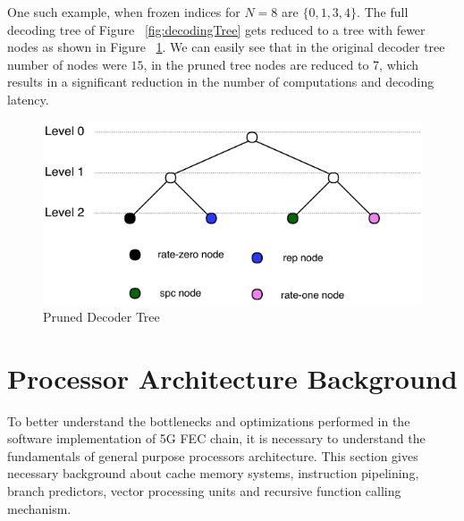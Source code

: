 One such example, when frozen indices for $N = 8$ are $\{0,1,3,4\}$. The full decoding tree of Figure ~\ref{fig:decodingTree} gets reduced to a tree with fewer nodes as shown in Figure ~\ref{fig:decodingTreePruned}. We can easily see that in the original decoder tree number of nodes were $15$, in the pruned tree nodes are reduced to 7, which results in a significant reduction in the number of computations and decoding latency.

\begin{figure}[h]
	\includegraphics{./figures/decodingTreePruned.pdf}
	\caption{Pruned Decoder Tree}
	\label{fig:decodingTreePruned}
\end{figure}




\section{Processor Architecture Background}
To better understand the bottlenecks and optimizations performed in the software implementation of 5G FEC chain, it is necessary to understand the fundamentals of general purpose processors architecture. This section gives necessary background about cache memory systems, instruction pipelining, branch predictors, vector processing units and recursive function calling mechanism.

